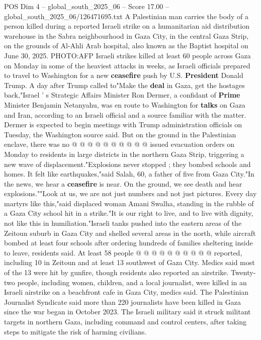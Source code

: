\begin{textsample}{POS Dim 4 – global\_south\_2025\_06 – Score 17.00 – global\_south\_2025\_06/126471695.txt}  \label{ex:f4_pos_360}
A Palestinian man carries the body of a person killed during a reported Israeli strike on a humanitarian aid distribution warehouse in the Sabra neighbourhood in Gaza City, in the central Gaza Strip, on the grounds of Al-Ahli Arab hospital, also known as the Baptist hospital on June 30, 2025.
PHOTO:AFP Israeli strikes killed at least 60 people across Gaza on Monday in some of the heaviest attacks in weeks, as Israeli officials prepared to travel to Washington for a new \textbf{ceasefire} push by U.S. \textbf{President} Donald Trump.
A day after Trump called to"Make the \textbf{deal} in Gaza, get the hostages back,"Israel ' s Strategic Affairs Minister Ron Dermer, a confidant of \textbf{Prime} Minister Benjamin Netanyahu, was en route to Washington for \textbf{talks} on Gaza and Iran, according to an Israeli official and a source familiar with the matter.
Dermer is expected to begin meetings with Trump administration officials on Tuesday, the Washington source said.
But on the ground in the Palestinian enclave, there was no @ @ @ @ @ @ @ @ @ @ issued evacuation orders on Monday to residents in large districts in the northern Gaza Strip, triggering a new wave of displacement."Explosions never stopped ; they bombed schools and homes.
It felt like earthquakes,"said Salah, 60, a father of five from Gaza City."In the news, we hear a \textbf{ceasefire} is near.
On the ground, we see death and hear explosions.""Look at us, we are not just numbers and not just pictures.
Every day martyrs like this,"said displaced woman Amani Swalha, standing in the rubble of a Gaza City school hit in a strike."It is our right to live, and to live with dignity, not like this in humiliation."Israeli tanks pushed into the eastern areas of the Zeitoun suburb in Gaza City and shelled several areas in the north, while aircraft bombed at least four schools after ordering hundreds of families sheltering inside to leave, residents said.
At least 58 people @ @ @ @ @ @ @ @ @ @ reported, including 10 in Zeitoun and at least 13 southwest of Gaza City.
Medics said most of the 13 were hit by gunfire, though residents also reported an airstrike.
Twenty-two people, including women, children, and a local journalist, were killed in an Israeli airstrike on a beachfront cafe in Gaza City, medics said.
The Palestinian Journalist Syndicate said more than 220 journalists have been killed in Gaza since the war began in October 2023.
The Israeli military said it struck militant targets in northern Gaza, including command and control centers, after taking steps to mitigate the risk of harming civilians.

\end{textsample}
